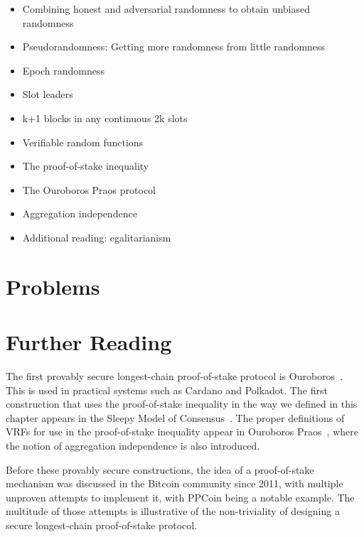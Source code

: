 



{\color{red}
\begin{itemize}
\item Combining honest and adversarial randomness to obtain unbiased randomness
\item Pseudorandomness: Getting more randomness from little randomness
\item Epoch randomness
\item Slot leaders
\item k+1 blocks in any continuous 2k slots
\item Verifiable random functions
\item The proof-of-stake inequality
\item The Ouroboros Praos protocol
\item Aggregation independence
\item Additional reading: egalitarianism
\end{itemize}
}

\section*{Problems}

\section*{Further Reading}

The first provably secure longest-chain proof-of-stake protocol is Ouroboros~\cite{ouroboros}.
This is used in practical systems such as Cardano and Polkadot. The first
construction that uses the proof-of-stake inequality in the way we defined in this chapter
appears in the Sleepy Model of Consensus~\cite{sleepy-model}. The proper definitions of
VRFs for use in the proof-of-stake inequality appear in Ouroboros Praos~\cite{praos},
where the notion of aggregation independence is also introduced.

Before these provably secure constructions, the idea of a proof-of-stake mechanism was
discussed in the Bitcoin community since 2011, with multiple unproven attempts to implement it,
with PPCoin being a notable example. The multitude of those attempts is illustrative of the
non-triviality of designing a secure longest-chain proof-of-stake protocol.